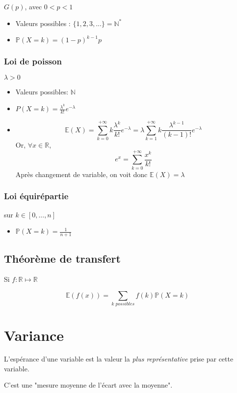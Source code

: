 \documentclass{article}
\begin{document}
$G(p)$, avec $0<p<1$
  \begin{itemize}
    \item Valeurs possibles : $\{1,2,3,...\}=\mathbb{N}^{*}$
    \item $ \mathbb{P}(X=k)=(1-p)^{k-1}p$
  \end{itemize}

\subsubsection{Loi de poisson}

$\lambda > 0$
  \begin{itemize}
    \item Valeurs possibles: $\mathbb{N}$
    \item $P(X=k)= \frac{\lambda^{k}}{k!}e^{-\lambda}$
    \item $$ \mathbb{E}(X) = \sum_{k=0}^{+ \infty} k \frac{\lambda^k}{k!}e^{-\lambda} = \lambda \sum_{k=1}^{+ \infty} k \frac{\lambda^{k-1}}{(k-1)!}e^{-\lambda} $$
    Or, $\forall x \in \mathbb{R}$, $$e^x = \sum_{k=0}^{+ \infty} \frac{x^k}{k!}$$
    Après changement de variable, on voit donc $\mathbb{E}(X) = \lambda$
  \end{itemize}

\subsubsection{Loi équirépartie}

sur $k \in [0,...,n]$
  \begin{itemize}
    \item $\mathbb{P}(X=k) = \frac{1}{n+1}$
  \end{itemize}

\subsection{Théorème de transfert}
Si $f: \mathbb{R} \mapsto \mathbb{R}$

$$\mathbb{E}(f(x)) = \sum_{\textit{k possibles}} f(k) \mathbb{P}(X=k)$$

\section{Variance}

L'espérance d'une variable est la valeur la \textit{plus représentative} prise
par cette variable.

C'est une "mesure moyenne de l'écart avec la moyenne".
\end{document}
